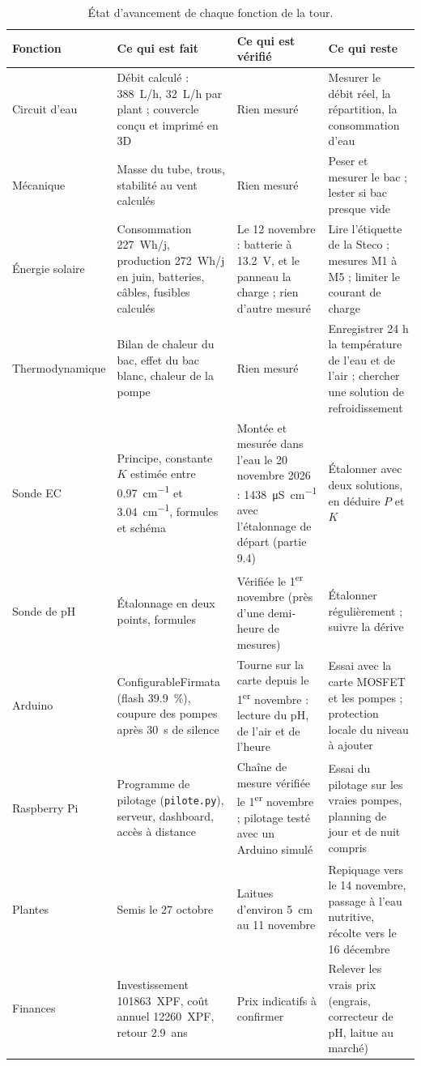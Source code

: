 \begin{table}[H]
\centering
\scriptsize
\renewcommand{\arraystretch}{1.1}
\begin{tabularx}{\textwidth}{|>{\raggedright\arraybackslash}p{2.6cm}|Y|Y|Y|}
\hline
\textbf{Fonction} & \textbf{Ce qui est fait} & \textbf{Ce qui est vérifié} & \textbf{Ce qui reste} \\
\hline
Circuit d'eau & Débit calculé : \qty{388}{L/h}, \qty{32}{L/h} par plant ; couvercle conçu et imprimé en 3D & Rien mesuré & Mesurer le débit réel, la répartition, la consommation d'eau \\
\hline
Mécanique & Masse du tube, trous, stabilité au vent calculés & Rien mesuré & Peser et mesurer le bac ; lester si bac presque vide \\
\hline
Énergie solaire & Consommation \qty{227}{Wh/j}, production \qty{272}{Wh/j} en juin, batteries, câbles, fusibles calculés & Le 12 novembre : batterie à \qty{13,2}{V}, et le panneau la charge ; rien d'autre mesuré & Lire l'étiquette de la Steco ; mesures M1 à M5 ; limiter le courant de charge \\
\hline
Thermodynamique & Bilan de chaleur du bac, effet du bac blanc, chaleur de la pompe & Rien mesuré & Enregistrer 24 h la température de l'eau et de l'air ; chercher une solution de refroidissement \\
\hline
Sonde EC & Principe, constante $K$ estimée entre \qty{0,97}{cm^{-1}} et \qty{3,04}{cm^{-1}}, formules et schéma & Montée et mesurée dans l'eau le 20 novembre 2026 : \qty{1438}{\micro S\per cm} avec l'étalonnage de départ (partie 9.4) & Étalonner avec deux solutions, en déduire $P$ et $K$ \\
\hline
Sonde de pH & Étalonnage en deux points, formules & Vérifiée le 1\textsuperscript{er} novembre (près d'une demi-heure de mesures) & Étalonner régulièrement ; suivre la dérive \\
\hline
Arduino & ConfigurableFirmata (flash \qty{39,9}{\percent}), coupure des pompes après \qty{30}{s} de silence & Tourne sur la carte depuis le 1\textsuperscript{er} novembre : lecture du pH, de l'air et de l'heure & Essai avec la carte MOSFET et les pompes ; protection locale du niveau à ajouter \\
\hline
Raspberry Pi & Programme de pilotage (\texttt{pilote.py}), serveur, dashboard, accès à distance & Chaîne de mesure vérifiée le 1\textsuperscript{er} novembre ; pilotage testé avec un Arduino simulé & Essai du pilotage sur les vraies pompes, planning de jour et de nuit compris \\
\hline
Plantes & Semis le 27 octobre & Laitues d'environ \qty{5}{cm} au 11 novembre & Repiquage vers le 14 novembre, passage à l'eau nutritive, récolte vers le 16 décembre \\
\hline
Finances & Investissement \qty{101863}{XPF}, coût annuel \qty{12260}{XPF}, retour \qty{2,9}{ans} & Prix indicatifs à confirmer & Relever les vrais prix (engrais, correcteur de pH, laitue au marché) \\
\hline
\end{tabularx}
\caption{État d'avancement de chaque fonction de la tour.}
\end{table}

